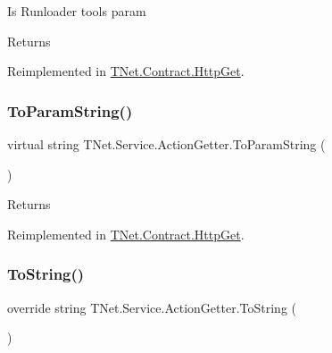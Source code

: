Is Runloader tool\textquotesingle{}s param 

\begin{DoxyReturn}{Returns}

\end{DoxyReturn}


Reimplemented in \mbox{\hyperlink{class_t_net_1_1_contract_1_1_http_get_aaa9bfb4336c9669f730263defee0176f}{T\+Net.\+Contract.\+Http\+Get}}.

\mbox{\label{class_t_net_1_1_service_1_1_action_getter_a705ee3441e620f15dcb5e52fcd9727ec}} 
\subsubsection{\texorpdfstring{To\+Param\+String()}{ToParamString()}}
{\footnotesize\ttfamily virtual string T\+Net.\+Service.\+Action\+Getter.\+To\+Param\+String (\begin{DoxyParamCaption}{ }\end{DoxyParamCaption})\hspace{0.3cm}{\ttfamily [virtual]}}





\begin{DoxyReturn}{Returns}

\end{DoxyReturn}


Reimplemented in \mbox{\hyperlink{class_t_net_1_1_contract_1_1_http_get_ae56808541aaa8e27cabf0813ee0dc424}{T\+Net.\+Contract.\+Http\+Get}}.

\mbox{\label{class_t_net_1_1_service_1_1_action_getter_aa78cf74b2f6a3a46d6e78b32c0c70921}} 
\subsubsection{\texorpdfstring{To\+String()}{ToString()}}
{\footnotesize\ttfamily override string T\+Net.\+Service.\+Action\+Getter.\+To\+String (\begin{DoxyParamCaption}{ }\end{DoxyParamCaption})}





